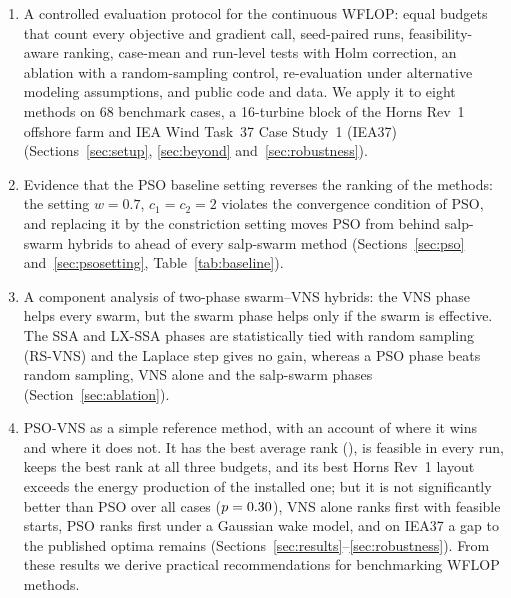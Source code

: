 \begin{enumerate}
\item A controlled evaluation protocol for the continuous WFLOP: equal budgets that count every objective and gradient call, seed-paired runs, feasibility-aware ranking, case-mean and run-level tests with Holm correction, an ablation with a random-sampling control, re-evaluation under alternative modeling assumptions, and public code and data. We apply it to eight methods on 68 benchmark cases, a 16-turbine block of the Horns Rev~1 offshore farm and IEA Wind Task~37 Case Study~1 (IEA37) (Sections~\ref{sec:setup}, \ref{sec:beyond} and~\ref{sec:robustness}).
\item Evidence that the PSO baseline setting reverses the ranking of the methods: the setting $w=0.7$, $c_1=c_2=2$ violates the convergence condition of PSO, and replacing it by the constriction setting moves PSO from behind salp-swarm hybrids to ahead of every salp-swarm method (Sections~\ref{sec:pso} and~\ref{sec:psosetting}, Table~\ref{tab:baseline}).
\item A component analysis of two-phase swarm--VNS hybrids: the VNS phase helps every swarm, but the swarm phase helps only if the swarm is effective. The SSA and LX-SSA phases are statistically tied with random sampling (RS-VNS) and the Laplace step gives no gain, whereas a PSO phase beats random sampling, VNS alone and the salp-swarm phases (Section~\ref{sec:ablation}).
\item PSO-VNS as a simple reference method, with an account of where it wins and where it does not. It has the best average rank (\NRankPSOVNS), is feasible in every run, keeps the best rank at all three budgets, and its best Horns Rev~1 layout exceeds the energy production of the installed one; but it is not significantly better than PSO over all cases ($p=0.30$), VNS alone ranks first with feasible starts, PSO ranks first under a Gaussian wake model, and on IEA37 a gap to the published optima remains (Sections~\ref{sec:results}--\ref{sec:robustness}). From these results we derive practical recommendations for benchmarking WFLOP methods.
\end{enumerate}

